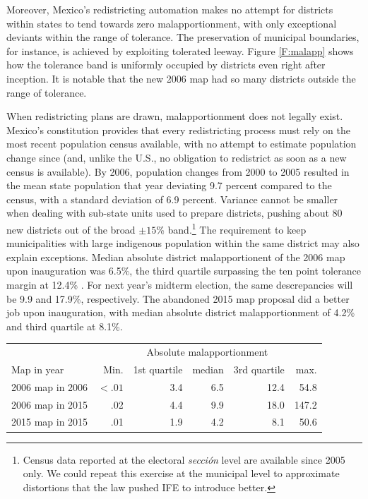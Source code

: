 \documentclass[letter,12pt]{article}
\newcommand{\mc}{\multicolumn}
\begin{document}
Moreover, Mexico's redistricting automation makes no attempt for districts within states to tend towards zero malapportionment, with only exceptional deviants within the range of tolerance. The preservation of municipal boundaries, for instance, is achieved by exploiting tolerated leeway. Figure \ref{F:malapp} shows how the tolerance band is uniformly occupied by districts even right after inception. It is notable that the new 2006 map had so many districts outside the range of tolerance. 

When redistricting plans are drawn, malapportionment does not legally exist. Mexico's constitution provides that every redistricting process must rely on the most recent population census available, with no attempt to estimate population change since (and, unlike the U.S., no obligation to redistrict as soon as a new census is available). By 2006, population changes from 2000 to 2005 resulted in the mean state population that year deviating 9.7 percent compared to the census, with a standard deviation of 6.9 percent. Variance cannot be smaller when dealing with sub-state units used to prepare districts, pushing about 80 new districts out of the broad $\pm 15$\% band.\footnote{Census data reported at the electoral \emph{secci\'on} level are available since 2005 only. We could repeat this exercise at the municipal level to approximate distortions that the law pushed IFE to introduce better.} The requirement to keep municipalities with large indigenous population within the same district may also explain exceptions. Median absolute district malapportionent of the 2006 map upon inauguration was 6.5\%, the third quartile surpassing the ten point tolerance margin at 12.4\% \citep[also,][]{trelles.mtz.tesisItam.2007}. For next year's midterm election, the same descrepancies will be 9.9 and 17.9\%, respectively. The abandoned 2015 map proposal did a better job upon inauguration, with median absolute district malapportionment of 4.2\% and third quartile at 8.1\%. 

\begin{tabular}{lrrrrr}
                 & \mc{5}{c}{Absolute malapportionment} \\
Map in year      & Min. & 1st quartile & median & 3rd quartile & max. \\ \hline
2006 map in 2006 & $<.01$ & 3.4 & 6.5 & 12.4 & 54.8 \\
2006 map in 2015 & .02 & 4.4 & 9.9 & 18.0 & 147.2 \\
2015 map in 2015 & .01 & 1.9 & 4.2 & 8.1 & 50.6 \\
\end{tabular}
\end{document}
